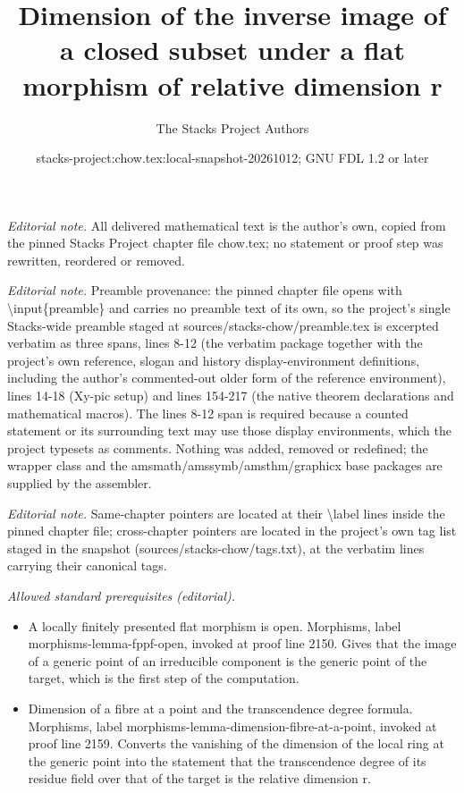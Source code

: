 \documentclass[10pt,a4paper]{amsart}
\title{Dimension of the inverse image of a closed subset under a flat morphism of relative dimension r}
\author{The Stacks Project Authors}
\date{stacks-project:chow.tex:local-snapshot-20261012; GNU FDL 1.2 or later}
\theoremstyle{plain}
\theoremstyle{definition}
\theoremstyle{remark}
\numberwithin{equation}{subsection}
\begin{document}
\maketitle
\noindent\textit{Editorial note.} All delivered mathematical text is the author's own, copied from the pinned Stacks Project chapter file chow.tex; no statement or proof step was rewritten, reordered or removed.\par\medskip
\noindent\textit{Editorial note.} Preamble provenance: the pinned chapter file opens with \textbackslash{}input\{preamble\} and carries no preamble text of its own, so the project's single Stacks-wide preamble staged at sources/stacks-chow/preamble.tex is excerpted verbatim as three spans, lines 8-12 (the verbatim package together with the project's own reference, slogan and history display-environment definitions, including the author's commented-out older form of the reference environment), lines 14-18 (Xy-pic setup) and lines 154-217 (the native theorem declarations and mathematical macros). The lines 8-12 span is required because a counted statement or its surrounding text may use those display environments, which the project typesets as comments. Nothing was added, removed or redefined; the wrapper class and the amsmath/amssymb/amsthm/graphicx base packages are supplied by the assembler.\par\medskip
\noindent\textit{Editorial note.} Same-chapter pointers are located at their \textbackslash{}label lines inside the pinned chapter file; cross-chapter pointers are located in the project's own tag list staged in the snapshot (sources/stacks-chow/tags.txt), at the verbatim lines carrying their canonical tags.\par\medskip
\noindent\textit{Allowed standard prerequisites (editorial).}\begin{itemize}
\item A locally finitely presented flat morphism is open. Morphisms, label morphisms-lemma-fppf-open, invoked at proof line 2150. Gives that the image of a generic point of an irreducible component is the generic point of the target, which is the first step of the computation.
\item Dimension of a fibre at a point and the transcendence degree formula. Morphisms, label morphisms-lemma-dimension-fibre-at-a-point, invoked at proof line 2159. Converts the vanishing of the dimension of the local ring at the generic point into the statement that the transcendence degree of its residue field over that of the target is the relative dimension r.
\end{itemize}\medskip
\end{document}
